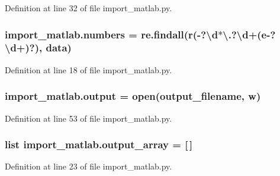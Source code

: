 Definition at line 32 of file import\+\_\+matlab.\+py.

\subsubsection[{\texorpdfstring{numbers}{numbers}}]{\setlength{\rightskip}{0pt plus 5cm}import\+\_\+matlab.\+numbers = re.\+findall(r\textquotesingle{}(-\/?\textbackslash{}d$\ast$\textbackslash{}.?\textbackslash{}d+(e-\/?\textbackslash{}d+)?)\textquotesingle{}, {\bf data})}\hypertarget{namespaceimport__matlab_ae6e8a21abac9a4c55a32dd4b2049fbf5}{}\label{namespaceimport__matlab_ae6e8a21abac9a4c55a32dd4b2049fbf5}


Definition at line 18 of file import\+\_\+matlab.\+py.

\subsubsection[{\texorpdfstring{output}{output}}]{\setlength{\rightskip}{0pt plus 5cm}import\+\_\+matlab.\+output = open({\bf output\+\_\+filename}, \textquotesingle{}w\textquotesingle{})}\hypertarget{namespaceimport__matlab_a06f190c191c2bbb695c9c7cb2f828c5a}{}\label{namespaceimport__matlab_a06f190c191c2bbb695c9c7cb2f828c5a}


Definition at line 53 of file import\+\_\+matlab.\+py.

\subsubsection[{\texorpdfstring{output\+\_\+array}{output_array}}]{\setlength{\rightskip}{0pt plus 5cm}list import\+\_\+matlab.\+output\+\_\+array = \mbox{[}$\,$\mbox{]}}\hypertarget{namespaceimport__matlab_a1260a243c2dd91664fa50ae9afef31bd}{}\label{namespaceimport__matlab_a1260a243c2dd91664fa50ae9afef31bd}


Definition at line 23 of file import\+\_\+matlab.\+py.

